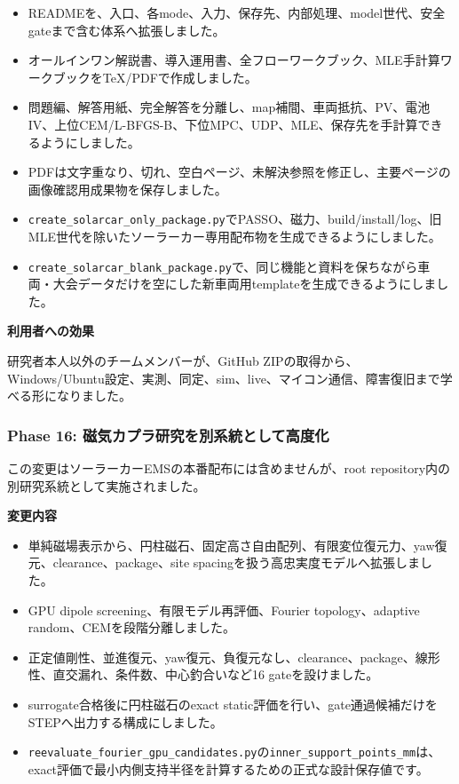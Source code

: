 \documentclass[
  japanese,
  a4paper,
  11pt]{article}
\providecommand{\tightlist}{%
  \setlength{\itemsep}{0pt}\setlength{\parskip}{0pt}}
\begin{document}
\begin{itemize}
\tightlist
\item
  READMEを、入口、各mode、入力、保存先、内部処理、model世代、安全gateまで含む体系へ拡張しました。
\item
  オールインワン解説書、導入運用書、全フローワークブック、MLE手計算ワークブックをTeX/PDFで作成しました。
\item
  問題編、解答用紙、完全解答を分離し、map補間、車両抵抗、PV、電池IV、上位CEM/L-BFGS-B、下位MPC、UDP、MLE、保存先を手計算できるようにしました。
\item
  PDFは文字重なり、切れ、空白ページ、未解決参照を修正し、主要ページの画像確認用成果物を保存しました。
\item
  \texttt{create\_solarcar\_only\_package.py}でPASSO、磁力、build/install/log、旧MLE世代を除いたソーラーカー専用配布物を生成できるようにしました。
\item
  \texttt{create\_solarcar\_blank\_package.py}で、同じ機能と資料を保ちながら車両・大会データだけを空にした新車両用templateを生成できるようにしました。
\end{itemize}

\textbf{利用者への効果}

研究者本人以外のチームメンバーが、GitHub
ZIPの取得から、Windows/Ubuntu設定、実測、同定、sim、live、マイコン通信、障害復旧まで学べる形になりました。

\subsubsection{Phase 16:
磁気カプラ研究を別系統として高度化}\label{phase-16-ux78c1ux6c17ux30abux30d7ux30e9ux7814ux7a76ux3092ux5225ux7cfbux7d71ux3068ux3057ux3066ux9ad8ux5ea6ux5316}

この変更はソーラーカーEMSの本番配布には含めませんが、root
repository内の別研究系統として実施されました。

\textbf{変更内容}

\begin{itemize}
\tightlist
\item
  単純磁場表示から、円柱磁石、固定高さ自由配列、有限変位復元力、yaw復元、clearance、package、site
  spacingを扱う高忠実度モデルへ拡張しました。
\item
  GPU dipole screening、有限モデル再評価、Fourier topology、adaptive
  random、CEMを段階分離しました。
\item
  正定値剛性、並進復元、yaw復元、負復元なし、clearance、package、線形性、直交漏れ、条件数、中心釣合いなど16
  gateを設けました。
\item
  surrogate合格後に円柱磁石のexact
  static評価を行い、gate通過候補だけをSTEPへ出力する構成にしました。
\item
  \texttt{reevaluate\_fourier\_gpu\_candidates.py}の\texttt{inner\_support\_points\_mm}は、exact評価で最小内側支持半径を計算するための正式な設計保存値です。
\end{itemize}
\end{document}
